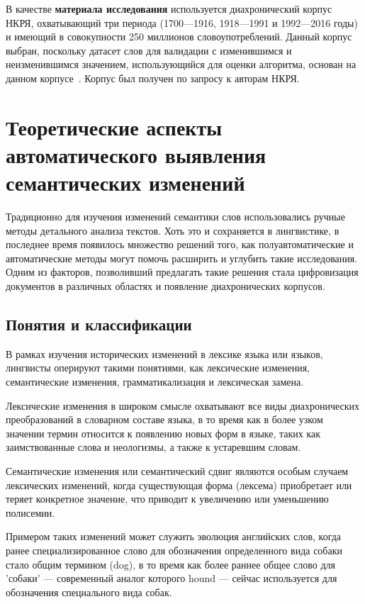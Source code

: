 \documentclass[LI,VKR]{HSEUniversity}
\begin{document}
В качестве \textbf{материала исследования} используется диахронический корпус НКРЯ, охватывающий
три периода (1700—1916, 1918—1991 и 1992—2016 годы) и имеющий в совокупности 250 миллионов
словоупотреблений.
Данный корпус выбран, поскольку датасет слов для валидации с изменившимся и неизменившимся значением,
использующийся для оценки алгоритма, основан на данном корпусе~\cite{rushifteval}.
Корпус был получен по запросу к авторам НКРЯ.

\chapter{Теоретические аспекты автоматического выявления семантических изменений}

Традиционно для изучения изменений семантики слов использовались ручные методы детального
анализа текстов.
Хоть это и сохраняется в лингвистике, в последнее время появилось множество решений того,
как полуавтоматические и автоматические методы могут помочь расширить и
углубить такие исследования.
Одним из факторов, позволивший предлагать такие решения стала цифровизация документов
в различных областях и появление диахронических корпусов.

\section{Понятия и классификации}

В рамках изучения исторических изменений в лексике языка или языков, лингвисты оперируют
такими понятиями, как лексические изменения, семантические изменения,
грамматикализация и лексическая замена.

Лексические изменения в широком смысле охватывают все виды диахронических преобразований
в словарном составе языка, в то время как в более узком значении термин относится к
появлению новых форм в языке, таких как заимствованные слова и неологизмы,
а также к устаревшим словам.

Семантические изменения или семантический сдвиг являются особым случаем лексических изменений,
когда существующая форма (лексема) приобретает или теряет конкретное значение,
что приводит к увеличению или уменьшению полисемии.

Примером таких изменений может служить эволюция английских слов, когда ранее специализированное
слово для обозначения определенного вида собаки стало общим термином (dog),
в то время как более раннее общее слово для 'собаки' — современный аналог которого
hound — сейчас используется для обозначения специального вида собак.
\end{document}
